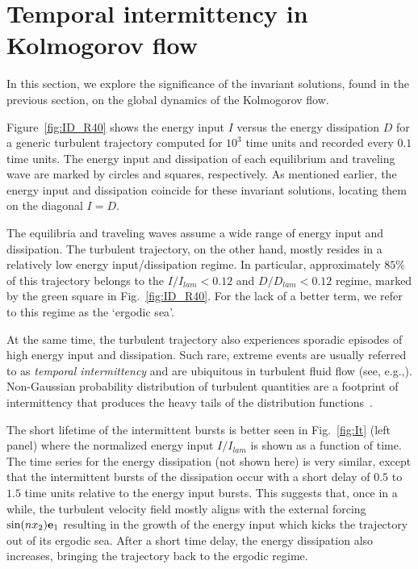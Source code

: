 \documentclass{jfm}
\begin{document}
\section{Temporal intermittency in Kolmogorov flow}\label{sec:interm}
In this section, we explore the significance of the invariant solutions, 
found in the previous section,
on the global dynamics of the Kolmogorov flow.

Figure~\ref{fig:ID_R40} shows the energy input $I$ versus the energy dissipation $D$
for a generic turbulent trajectory computed for $10^3$ time units
and recorded every $0.1$ time units.
The energy input
and dissipation of each equilibrium and traveling wave are marked by circles and squares,
respectively. As mentioned earlier, the energy input and dissipation coincide for these invariant
solutions, locating them on the diagonal $I=D$.

The equilibria and traveling waves assume a wide range of energy input and dissipation.
The turbulent trajectory, on the other hand,
mostly resides in a relatively low energy input/dissipation
regime. In particular, approximately $85\%$ of this trajectory belongs to the $I/I_{lam}<0.12$ and
$D/D_{lam}<0.12$ regime, marked by the green square in Fig.~\ref{fig:ID_R40}. For the lack
of a better term, we refer to this regime as the `ergodic sea'.

At the same time, the turbulent trajectory also experiences sporadic episodes of high energy input
and dissipation. Such rare, extreme events are usually referred to as \emph{temporal intermittency}
and are ubiquitous in turbulent fluid flow (see, e.g.,).
Non-Gaussian probability distribution of
turbulent quantities are a footprint of intermittency that produces the
heavy tails of the distribution functions~\citep{frisch, mini10}.

The short lifetime of the intermittent bursts is better seen in Fig.~\ref{fig:It}
(left panel) where the normalized energy input $I/I_{lam}$ is shown
as a function of time. The time series for the energy dissipation
(not shown here) is very similar, except that the intermittent bursts of
the dissipation occur with a short delay of $0.5$ to $1.5$ time units
relative to the energy input bursts. This suggests that, once in a while,
the turbulent velocity field mostly aligns with the external forcing $\sin(nx_2)\mathbf e_1$
resulting in the growth of the energy input which kicks the
trajectory out of its ergodic sea. After a short time delay, the energy
dissipation also increases, bringing the trajectory back to the ergodic regime.
\end{document}
